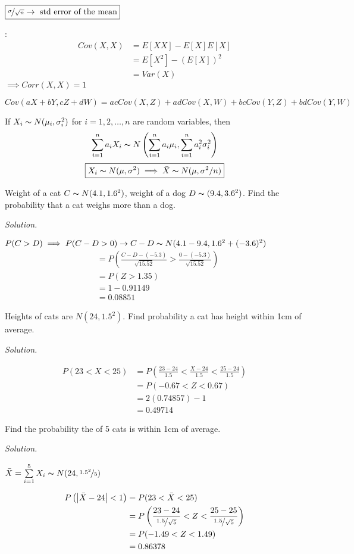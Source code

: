 $\boxed{\nicefrac{\sigma}{\sqrt{n}}\rightarrow\text{ std error of the mean}}$

:
\begin{align*}
    Cov(X,X)
    &=E[XX]-E[X]E[X]\\
    &=E[X^2]-(E[X])^2\\
    &=Var(X)
\end{align*}
$ \implies Corr(X,X)=1 $


$ Cov(aX+bY,cZ+dW)=acCov(X,Z)+adCov(X,W)+bcCov(Y,Z)+bdCov(Y,W) $


If $ X_i \thicksim N(\mu_i,\sigma_i^2) $ for $ i=1,2,\ldots ,n $
are random variables, then
\[ \sum\limits_{i=1}^{n} a_i X_i \thicksim 
N\left(\sum\limits_{i=1}^{n}a_i\mu_i,\sum\limits_{i=1}^{n} a_i^2\sigma_i^2\right) \]
\[ \boxed{X_i \thicksim N(\mu,\sigma^2)\implies\bar{X} \thicksim N(\mu,\sigma^2/n)} \]


Weight of a cat $ C \thicksim N(4.1,1.6^2) $, weight of a dog
$ D \thicksim (9.4,3.6^2) $. Find the probability that a cat weighs more than
a dog.

\emph{Solution.}

$ P(C>D)\implies P(C-D>0)\rightarrow C-D \thicksim N(4.1-9.4,1.6^2+(-3.6)^2)$
\begin{align*}
    &=P\left(\frac{C-D-(-5.3)}{\sqrt{15.52}}>\frac{0-(-5.3)}{\sqrt{15.52}}\right)\\
    &=P(Z>1.35)\\
    &=1-0.91149\\
    &=0.08851
\end{align*}


Heights of cats are $ N(24,1.5^2) $. Find probability a cat has height
within 1cm of average.

\emph{Solution.}

\begin{align*}
    P(23<X<25)&=
    P\left( \frac{23-24}{1.5}<\frac{X-24}{1.5}<\frac{25-24}{1.5} \right)\\
    &=P(-0.67<Z<0.67)\\
    &=2(0.74857)-1\\
    &=0.49714
\end{align*}


Find the probability the  of 5 cats is within 1cm of average.

\emph{Solution.}

$ \bar{X}=\sum\limits_{i=1}^{5} X_i \thicksim N(24,\nicefrac{1.5^2}{5}) $

\begin{align*}
    P\left(\left|\bar{X}-24\right|<1\right)&=
    P(23<\bar{X}<25)\\
    &=P\left( \frac{23-24}{\nicefrac{1.5}{\sqrt{5}}}<Z<
    \frac{25-25}{\nicefrac{1.5}{\sqrt{5}}} \right)\\
    &=P(-1.49<Z<1.49)\\
    &=0.86378
\end{align*}